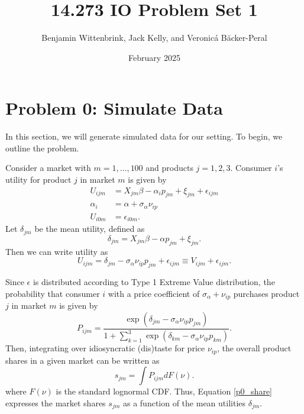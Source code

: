 \documentclass{article}
\title{14.273 IO Problem Set 1}
\author{Benjamin Wittenbrink, Jack Kelly, and Veronicá Bäcker-Peral}
\date{February 2025}
\begin{document}
\maketitle

\section*{Problem 0: Simulate Data}
\begin{answer}

In this section, we will generate simulated data for our setting. To begin, we outline the problem.

Consider a market with $m = 1, \dots, 100$ and products $j = 1, 2, 3$. Consumer $i$'s utility for product $j$ in market $m$ is given by 
\begin{align}
    U_{ijm} &= X_{jm} \beta - \alpha_i p_{jm} + \xi_{jm} + \epsilon_{ijm} \\ 
    \alpha_i &= \alpha + \sigma_\alpha \nu_{ip} \\ 
    U_{i0m} &= \epsilon_{i0m}. 
\end{align}
Let $\delta_{jm}$ be the mean utility, defined as 
\begin{equation}
    \delta_{jm} = X_{jm} \beta - \alpha p_{jm} + \xi_{jm}. 
\end{equation}
Then we can write utility as 
\[
U_{ijm} = \delta_{jm} - \sigma_\alpha \nu_{ip} p_{jm} + \epsilon_{ijm} \equiv V_{ijm} + \epsilon_{ijm}.
\]

Since $\epsilon$ is distributed according to Type 1 Extreme Value distribution, the probability that consumer $i$ with a price coefficient of $\sigma_\alpha + \nu_{ip}$ purchases product $j$ in market $m$ is given by 
\begin{equation}\label{p0_proba}
    P_{ijm} = \frac{\exp(\delta_{jm} - \sigma_\alpha \nu_{ip} p_{jm})}{
    1 + \sum_{k=1}^3 \exp(\delta_{km} - \sigma_\alpha \nu_{ip} p_{km})
    }.
\end{equation}
Then, integrating over idiosyncratic (dis)taste for price $\nu_{ip}$, the overall product shares in a given market can be written as 
\begin{equation}\label{p0_share}
    s_{jm} = \int P_{ijm} d F(\nu).
\end{equation} 
where $F(\nu)$ is the standard lognormal CDF.
Thus, Equation \ref{p0_share} expresses the market shares $s_{jm}$ as a function of the mean utilities $\delta_{jm}$. 


\end{answer}
\end{document}
